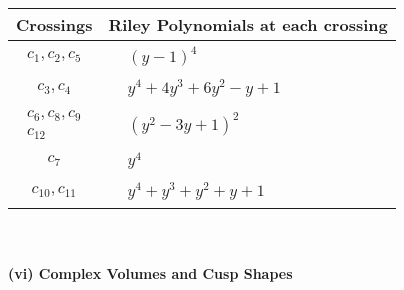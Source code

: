 \documentclass[1p]{elsarticle_modified}
\theoremstyle{definition}
\begin{document}
\begin{tabular}{m{50pt}|m{274pt}}
Crossings & \hspace{64pt}Riley Polynomials at each crossing \\
\hline $$\begin{aligned}c_{1},c_{2},c_{5}\end{aligned}$$&$\begin{aligned}
&(y-1)^4
\end{aligned}$\\
\hline $$\begin{aligned}c_{3},c_{4}\end{aligned}$$&$\begin{aligned}
&y^4+4 y^3+6 y^2- y+1
\end{aligned}$\\
\hline $$\begin{aligned}c_{6},c_{8},c_{9}\\c_{12}\end{aligned}$$&$\begin{aligned}
&(y^2-3 y+1)^2
\end{aligned}$\\
\hline $$\begin{aligned}c_{7}\end{aligned}$$&$\begin{aligned}
&y^4
\end{aligned}$\\
\hline $$\begin{aligned}c_{10},c_{11}\end{aligned}$$&$\begin{aligned}
&y^4+y^3+y^2+y+1
\end{aligned}$\\
\hline
\end{tabular}\\~\\
\newpage\flushleft \textbf{(vi) Complex Volumes and Cusp Shapes}
\end{document}
